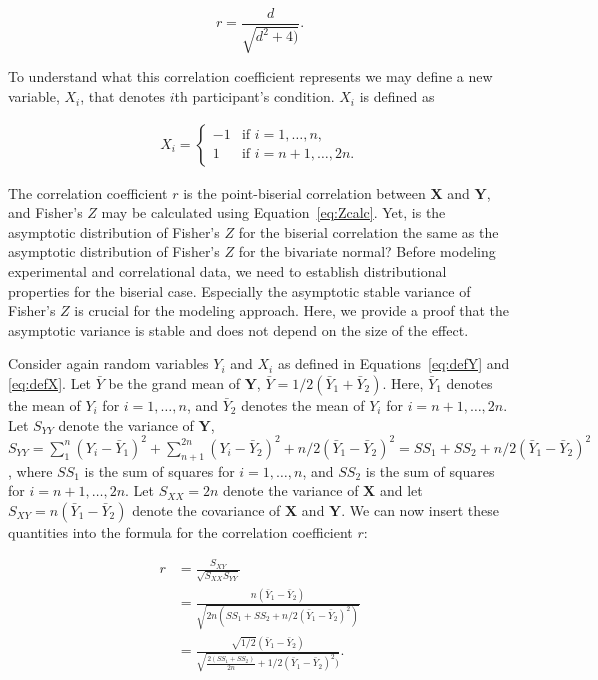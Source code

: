 \documentclass[english,,man]{apa6}
\begin{document}
\[
r = \frac{d}{\sqrt{d^2 + 4)}}.
\]

To understand what this correlation coefficient represents we may define a new variable, \(X_i\), that denotes \(i\)th participant's condition. \(X_i\) is defined as

\begin{align}\label{eq:defX}
X_{i} = \begin{cases} -1 & \mbox{if } i = 1, \ldots, n,\\ 1 & \mbox{if } i = n + 1, \ldots, 2n. \end{cases}
\end{align}

The correlation coefficient \(r\) is the point-biserial correlation between \(\mathbf{X}\) and \(\mathbf{Y}\), and Fisher's \(Z\) may be calculated using Equation~\eqref{eq:Zcalc}. Yet, is the asymptotic distribution of Fisher's \(Z\) for the biserial correlation the same as the asymptotic distribution of Fisher's \(Z\) for the bivariate normal? Before modeling experimental and correlational data, we need to establish distributional properties for the biserial case. Especially the asymptotic stable variance of Fisher's \(Z\) is crucial for the modeling approach. Here, we provide a proof that the asymptotic variance is stable and does not depend on the size of the effect.

Consider again random variables \(Y_i\) and \(X_i\) as defined in Equations~\eqref{eq:defY} and \eqref{eq:defX}. Let \(\bar{Y}\) be the grand mean of \(\mathbf{Y}\), \(\bar{Y} = 1/2 (\bar{Y}_1 + \bar{Y}_2)\). Here, \(\bar{Y}_1\) denotes the mean of \(Y_i\) for \(i = 1, \ldots, n\), and \(\bar{Y}_2\) denotes the mean of \(Y_i\) for \(i = n + 1, \ldots, 2n\). Let \(S_{YY}\) denote the variance of \(\mathbf{Y}\), \(S_{YY} = \sum_1^n (Y_i - \bar{Y}_1)^2 + \sum_{n+1}^{2n} ( Y_i - \bar{Y}_2)^2 + n/2 (\bar{Y}_1 - \bar{Y}_2)^2 = SS_1 + SS_2 + n/2 (\bar{Y}_1 - \bar{Y}_2)^2\), where \(SS_1\) is the sum of squares for \(i = 1, \ldots, n\), and \(SS_2\) is the sum of squares for \(i = n + 1, \ldots, 2n\). Let \(S_{XX} = 2n\) denote the variance of \(\mathbf{X}\) and let \(S_{XY} = n(\bar{Y}_1 - \bar{Y}_2)\) denote the covariance of \(\mathbf{X}\) and \(\mathbf{Y}\). We can now insert these quantities into the formula for the correlation coefficient \(r\):

\begin{align*}
r &= \frac{S_{XY}}{\sqrt{S_{XX}S_{YY}}}\\
&= \frac{n(\bar{Y}_1 - \bar{Y}_2)}{\sqrt{2n(SS_1 + SS_2 + n/2 (\bar{Y}_1 - \bar{Y}_2)^2)}}\\
&= \frac{\sqrt{1/2}(\bar{Y}_1 - \bar{Y}_2)}{\sqrt{\frac{2(SS_1 + SS_2)}{2n} + 1/2(\bar{Y}_1 - \bar{Y}_2)^2)}}.
\end{align*}
\end{document}
